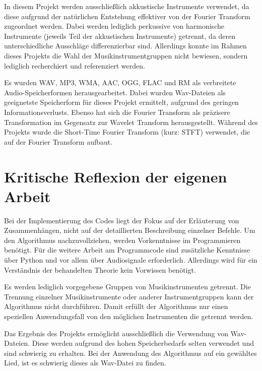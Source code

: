 In diesem Projekt werden ausschließlich akkustische Instrumente verwendet, da diese aufgrund der natürlichen Entstehung effektiver von der Fourier Transform zugeordnet werden.
Dabei werden lediglich perkussive von harmonische Instrumente (jeweils Teil der akkustischen Instrumente) getrennt, da deren unterschiedliche Ausschläge differenzierbar sind.
Allerdings konnte im Rahmen dieses Projekts die Wahl der Musikinstrumentgruppen nicht bewiesen, sondern lediglich recherchiert und referenziert werden.

\par

Es wurden WAV, MP3, WMA, AAC, OGG, FLAC und RM als verbreitete Audio-Speicherformen herausgearbeitet.
Dabei wurden Wav-Dateien als geeignetste Speicherform für dieses Projekt ermittelt, aufgrund des geringen Informationsverlusts.
Ebenso hat sich die Fourier Transform als präzisere Transformation im Gegensatz zur Wavelet Transform herausgestellt.
Während des Projekts wurde die Short-Time Fourier Transform (kurz: STFT) verwendet, die auf der Fourier Transform aufbaut.

%
\section{Kritische Reflexion der eigenen Arbeit}
%

Bei der Implementierung des Codes liegt der Fokus auf der Erläuterung von Zusammenhängen, nicht auf der detaillierten Beschreibung einzelner Befehle.
Um den Algorithmus nachzuvollziehen, werden Vorkenntnisse im Programmieren benötigt.
Für die weitere Arbeit am Programmcode sind zusätzliche Kenntnisse über Python und vor allem über Audiosignale erforderlich.
Allerdings wird für ein Verständnis der behandelten Theorie kein Vorwissen benötigt.

\par

Es werden lediglich vorgegebene Gruppen von Musikinstrumenten getrennt.
Die Trennung einzelner Musikinstrumente oder anderer Instrumentgruppen kann der Algorithmus nicht durchführen.
Damit erfüllt der Algorithmus nur einen speziellen Anwendungsfall von den möglichen Instrumenten die getrennt werden.

\par

Das Ergebnis des Projekts ermöglicht ausschließlich die Verwendung von Wav-Dateien.
Diese werden aufgrund des hohen Speicherbedarfs selten verwendet und sind schwierig zu erhalten.
Bei der Anwendung des Algorithmus auf ein gewähltes Lied, ist es schwierig dieses als Wav-Datei zu finden.

